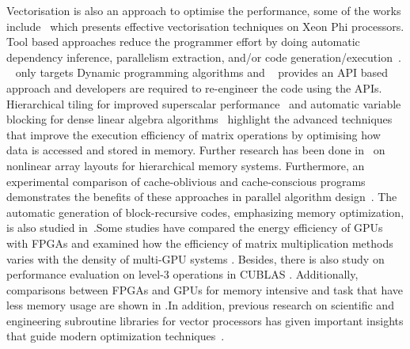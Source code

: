 Vectorisation is also an approach to optimise the performance, some of the works include~\cite{tian2015effective} which presents effective vectorisation techniques on Xeon Phi processors.
Tool based approaches reduce the programmer effort by doing automatic dependency inference, parallelism extraction, and/or code generation/execution~\cite{hegde2019d2p, van2009libflame}. ~\cite{hegde2019d2p} only targets Dynamic programming algorithms and ~\cite{van2009libflame} provides an API based approach and developers are required to re-engineer the code using the APIs.
Hierarchical tiling for improved superscalar performance~\cite{carter1995hierarchical} and automatic variable blocking for dense linear algebra algorithms~\cite{gustavson1997recursion} highlight the advanced techniques that improve the execution efficiency of matrix operations by optimising how data is accessed and stored in memory. Further research has been done in~\cite{chatterjee1999nonlinear} on nonlinear array layouts for hierarchical memory systems. Furthermore, an experimental comparison of cache-oblivious and cache-conscious programs demonstrates the benefits of these approaches in parallel algorithm design~\cite{yotov2007experimental}. The automatic generation of block-recursive codes, emphasizing memory optimization, is also studied in~\cite{ahmed2000automatic}.Some studies have compared the energy efficiency of GPUs with FPGAs \cite{mittal2014survey} and examined how the efficiency of matrix multiplication methods varies with the density of multi-GPU systems \cite{zhang2015matrix}. Besides, there is also study on performance evaluation on level-3 operations in CUBLAS \cite{barrachina2008evaluation}.
 Additionally, comparisons between FPGAs and GPUs for memory intensive and task that have less memory usage are shown in \cite{betkaoui2010comparing}.In addition, previous research on scientific and engineering subroutine libraries for vector processors has given important insights that guide modern optimization techniques~\cite{agarwal1989engineering}.
